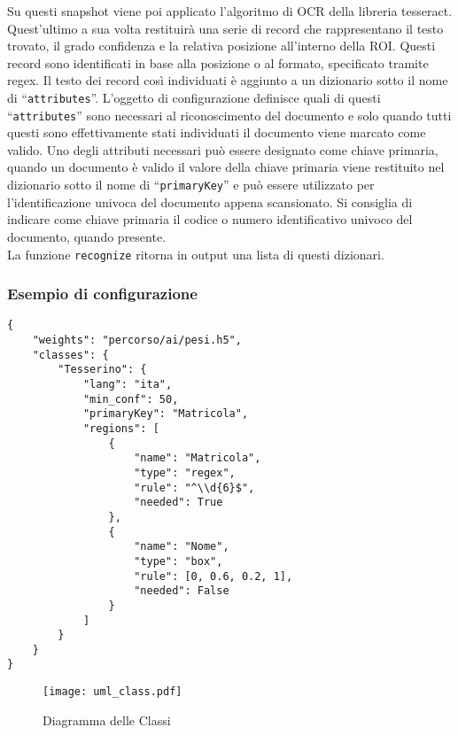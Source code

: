 \documentclass[12pt,a4paper]{article}
\begin{document}
Su questi snapshot viene poi applicato l'algoritmo di OCR della libreria
tesseract. Quest'ultimo a sua volta restituirà una serie di record che
rappresentano il testo trovato, il grado confidenza e la relativa
posizione all'interno della ROI. Questi record sono identificati in base
alla posizione o al formato, specificato tramite regex. Il testo dei
record così individuati è aggiunto a un dizionario sotto il nome di
``\texttt{attributes}''. L'oggetto di configurazione definisce quali di
questi ``\texttt{attributes}'' sono necessari al riconoscimento del
documento e solo quando tutti questi sono effettivamente stati
individuati il documento viene marcato come valido. Uno degli attributi
necessari può essere designato come chiave primaria, quando un documento
è valido il valore della chiave primaria viene restituito nel dizionario
sotto il nome di ``\texttt{primaryKey}'' e può essere utilizzato per
l'identificazione univoca del documento appena scansionato. Si consiglia
di indicare come chiave primaria il codice o numero identificativo
univoco del documento, quando presente.\\
La funzione \texttt{recognize} ritorna in output una lista di questi
dizionari.

\pagebreak

\subsubsection{Esempio di configurazione}
\begin{verbatim}
{
    "weights": "percorso/ai/pesi.h5",
    "classes": {
        "Tesserino": {
            "lang": "ita",
            "min_conf": 50,
            "primaryKey": "Matricola",
            "regions": [
                {
                    "name": "Matricola",
                    "type": "regex",
                    "rule": "^\\d{6}$",
                    "needed": True
                },
                {
                    "name": "Nome",
                    "type": "box",
                    "rule": [0, 0.6, 0.2, 1],
                    "needed": False
                }
            ]
        }
    }
}
\end{verbatim}

\begin{figure}[p]
  \caption{Diagramma delle Classi}
  \centering
  \texttt{[image: uml\_class.pdf]}
\end{figure}
\end{document}
